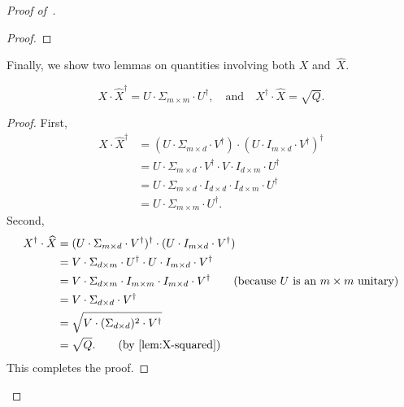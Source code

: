 \begin{proof}[Proof of~]
\begin{proof}
\end{proof}

Finally, we show two lemmas on quantities involving both $X$ and~$\widehat{X}$.

\begin{lemma}\label{lem:X-times-X-hat}
\begin{equation*}
X \cdot \widehat{X}^\dagger = U  \cdot \Sigma_{m \times m} \cdot U^\dagger,
\quad
\text{and}
\quad
X^\dagger \cdot \widehat{X} = \sqrt{Q}.
\end{equation*}
\end{lemma}
\begin{proof}
First,
\begin{align*}
X \cdot \widehat{X}^\dagger
&= (U  \cdot \Sigma_{m \times d} \cdot V^\dagger) \cdot (U  \cdot I_{m \times d} \cdot V^\dagger)^\dagger\\
&= U  \cdot \Sigma_{m \times d} \cdot V^\dagger \cdot V \cdot I_{d \times m} \cdot U^\dagger\\
&= U  \cdot \Sigma_{m \times d} \cdot I_{d \times d} \cdot I_{d \times m} \cdot U^\dagger \tag{because~$V$ is a $d \times d$ unitary}\\
&= U  \cdot \Sigma_{m \times m} \cdot U^\dagger \tag{because~$m \leq d$}.
\end{align*}
Second,
\begin{align*}
X^\dagger \cdot \widehat{X}
&= (U  \cdot \Sigma_{m \times d} \cdot V^\dagger)^\dagger \cdot (U  \cdot I_{m \times d} \cdot V^\dagger)\\
&= V \cdot \Sigma_{d \times m} \cdot U^\dagger \cdot U \cdot I_{m \times d} \cdot V^\dagger\\
&= V \cdot \Sigma_{d \times m} \cdot I_{m \times m} \cdot I_{m \times d} \cdot V^\dagger \tag{because~$U$ is an $m \times m$ unitary}\\
&= V \cdot \Sigma_{d \times d} \cdot V^\dagger\\
&= \sqrt{V \cdot (\Sigma_{d \times d})^2 \cdot V^\dagger}\\
&= \sqrt{Q}. \tag{by \Cref{lem:X-squared}}
\end{align*}
This completes the proof.
\end{proof}


\end{proof}
